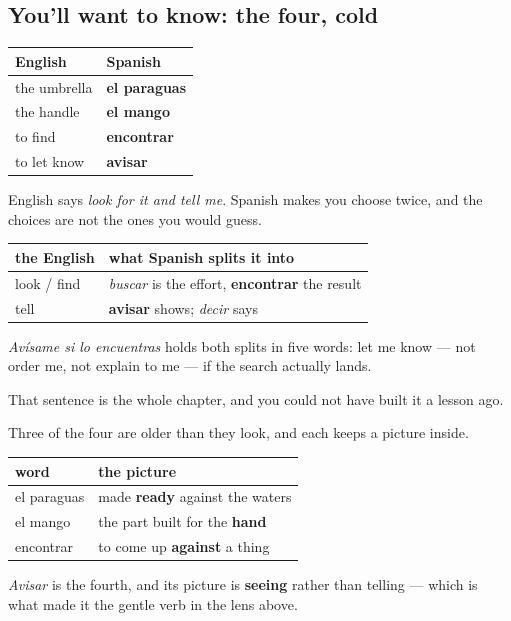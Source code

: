 \subsection*{You'll want to know: the four, cold}
\noindent
\begin{tabularx}{\linewidth}{@{}>{\raggedright\arraybackslash}X>{\raggedright\arraybackslash}X@{}}
\toprule
\textbf{English} & \textbf{Spanish} \\
\midrule
the umbrella & \textbf{el paraguas} \\
the handle & \textbf{el mango} \\
to find & \textbf{encontrar} \\
to let know & \textbf{avisar} \\
\bottomrule
\end{tabularx}

\begin{grammarlens}[title={Grammar Lens: one English verb, two Spanish ones}]
English says \emph{look for it and tell me}. Spanish makes you choose twice, and the choices are not the ones you would guess.

\noindent
\begin{tabularx}{\linewidth}{@{}>{\raggedright\arraybackslash}X>{\raggedright\arraybackslash}X@{}}
\toprule
\textbf{the English} & \textbf{what Spanish splits it into} \\
\midrule
look / find & \emph{buscar} is the effort, \textbf{encontrar} the result \\
tell & \textbf{avisar} shows; \emph{decir} says \\
\bottomrule
\end{tabularx}

\emph{Avísame si lo encuentras} holds both splits in five words: let me know — not order me, not explain to me — if the search actually lands.

That sentence is the whole chapter, and you could not have built it a lesson ago.
\end{grammarlens}

\begin{cousinweb}
Three of the four are older than they look, and each keeps a picture inside.

\noindent
\begin{tabularx}{\linewidth}{@{}>{\raggedright\arraybackslash}X>{\raggedright\arraybackslash}X@{}}
\toprule
\textbf{word} & \textbf{the picture} \\
\midrule
el paraguas & made \textbf{ready} against the waters \\
el mango & the part built for the \textbf{hand} \\
encontrar & to come up \textbf{against} a thing \\
\bottomrule
\end{tabularx}

\emph{Avisar} is the fourth, and its picture is \textbf{seeing} rather than telling — which is what made it the gentle verb in the lens above.
\end{cousinweb}

